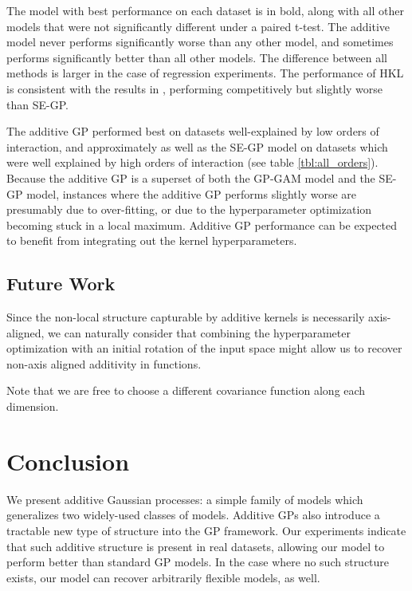The model with best performance on each dataset is in bold, along with all other models that were not significantly different under a paired t-test. The additive model never performs significantly worse than any other model, and sometimes performs significantly better than all other models.  The difference between all methods is larger in the case of regression experiments. The performance of HKL is consistent with the results in \cite{DBLP:journals/corr/abs-0909-0844}, performing competitively but slightly worse than SE-GP.%

The additive GP performed best on datasets well-explained by low orders of interaction, and approximately as well as the SE-GP model on datasets which were well explained by high orders of interaction (see table \ref{tbl:all_orders}).
Because the additive GP is a superset of both the GP-GAM model and the SE-GP model, instances where the additive GP performs slightly worse are presumably due to over-fitting, or due to the hyperparameter optimization becoming stuck in a local maximum. %
Additive GP performance can be expected to benefit from integrating out the kernel hyperparameters.



\subsection{Future Work}
Since the non-local structure capturable by additive kernels is necessarily axis-aligned, we can naturally consider that combining the hyperparameter optimization with an initial rotation of the input space might allow us to recover non-axis aligned additivity in functions.

Note that we are free to choose a different covariance function along each dimension.


\section{Conclusion}

We present additive Gaussian processes: a simple family of models which generalizes two widely-used classes of models.  Additive GPs also introduce a tractable new type of structure into the GP framework.   Our experiments indicate that such additive structure is present in real datasets, allowing our model to perform better than standard GP models.  In the case where no such structure exists, our model can recover arbitrarily flexible models, as well.

